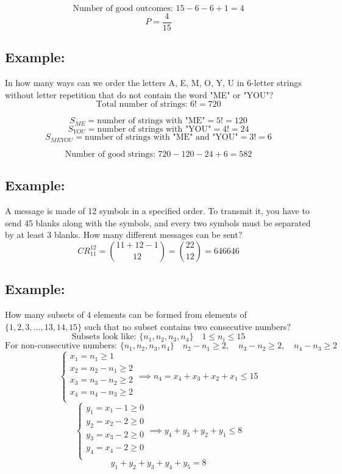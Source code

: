 \documentclass[11pt]{article}
\begin{document}
\[
\text{Number of good outcomes: } 15 - 6 - 6 + 1 = 4
\]
\[
P = \frac{4}{15}
\]

\subsection*{Example:}
In how many ways can we order the letters A, E, M, O, Y, U in 6-letter strings without letter repetition that do not contain the word "ME" or "YOU"?
\[
\text{Total number of strings: } 6! = 720
\]

\[
S_{ME} = \text{number of strings with "ME"} = 5! = 120
\]
\[
S_{YOU} = \text{number of strings with "YOU"} = 4! = 24
\]
\[
S_{MEYOU} = \text{number of strings with "ME" and "YOU"} = 3! = 6
\]

\[
\text{Number of good strings: } 720 - 120 - 24 + 6 = 582
\]

\subsection*{Example:}
A message is made of 12 symbols in a specified order. To transmit it, you have to send 45 blanks along with the symbols, and every two symbols must be separated by at least 3 blanks. How many different messages can be sent?
\[
CR_{11}^{12} = \binom{11 + 12 - 1}{12} = \binom{22}{12} = 646646
\]

\subsection*{Example:}
How many subsets of 4 elements can be formed from elements of $\{1, 2, 3, \dots, 13, 14, 15\}$ such that no subset contains two consecutive numbers?
\[
\text{Subsets look like: } \{n_1, n_2, n_3, n_4\} \quad 1 \leq n_i \leq 15
\]
\[
\text{For non-consecutive numbers: } \{n_1, n_2, n_3, n_4\} \quad n_2 - n_1 \geq 2, \quad n_3 - n_2 \geq 2, \quad n_4 - n_3 \geq 2
\]
\[
\begin{cases}
    x_1 = n_1 \geq 1 \\
    x_2 = n_2 - n_1 \geq 2 \\
    x_3 = n_3 - n_2 \geq 2 \\
    x_4 = n_4 - n_3 \geq 2 \\
\end{cases} \implies 
n_4 = x_4 + x_3 + x_2 + x_1 \leq 15
\]
\[
\begin{cases}
    y_1 = x_1 - 1 \geq 0 \\
    y_2 = x_2 - 2 \geq 0 \\
    y_3 = x_3 - 2 \geq 0 \\
    y_4 = x_4 - 2 \geq 0 \\
\end{cases} \implies
y_4 + y_3 + y_2 + y_1 \leq 8
\]
\[
y_1 + y_2 + y_3 + y_4 + y_5 = 8
\]
\end{document}
